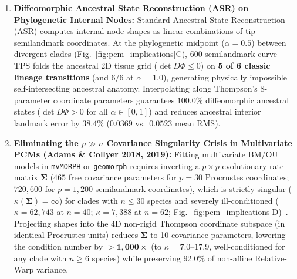 \documentclass[11pt,a4paper]{article}
\theoremstyle{definition}
\theoremstyle{remark}
\begin{document}
\begin{enumerate}
  \item \textbf{Diffeomorphic Ancestral State Reconstruction (ASR) on Phylogenetic Internal Nodes:}
  Standard Ancestral State Reconstruction (ASR) computes internal node shapes as linear combinations of tip semilandmark coordinates. At the phylogenetic midpoint ($\alpha = 0.5$) between divergent clades (Fig.~\ref{fig:pcm_implications}C), 600-semilandmark curve TPS folds the ancestral 2D tissue grid ($\det D\Phi \le 0$) on \textbf{5 of 6 classic lineage transitions} (and $6/6$ at $\alpha = 1.0$), generating physically impossible self-intersecting ancestral anatomy. Interpolating along Thompson's 8-parameter coordinate parameters guarantees $\mathbf{100.0\%}$ diffeomorphic ancestral states ($\det D\Phi > 0$ for all $\alpha \in [0, 1]$) and reduces ancestral interior landmark error by $\mathbf{38.4\%}$ ($0.0369$ vs.\ $0.0523$ mean RMS).

  \item \textbf{Eliminating the $p \gg n$ Covariance Singularity Crisis in Multivariate PCMs (Adams \& Collyer 2018, 2019):}
  Fitting multivariate BM/OU models in \texttt{mvMORPH} or \texttt{geomorph} requires inverting a $p \times p$ evolutionary rate matrix $\mathbf{\Sigma}$ ($465$ free covariance parameters for $p = 30$ Procrustes coordinates; $720{,}600$ for $p = 1{,}200$ semilandmark coordinates), which is strictly singular ($\kappa(\mathbf{\Sigma}) = \infty$) for clades with $n \le 30$ species and severely ill-conditioned ($\kappa = 62{,}743$ at $n = 40$; $\kappa = 7{,}388$ at $n = 62$; Fig.~\ref{fig:pcm_implications}D)~\cite{AdamsCollyer2018}. Projecting shapes into the 4D non-rigid Thompson coordinate subspace (in identical Procrustes units) reduces $\mathbf{\Sigma}$ to 10 covariance parameters, lowering the condition number by $\mathbf{>1{,}000\times}$ (to $\kappa = \mathbf{7.0\text{--}17.9}$, well-conditioned for any clade with $n \ge 6$ species) while preserving $92.0\%$ of non-affine Relative-Warp variance.
\end{enumerate}
\end{document}
